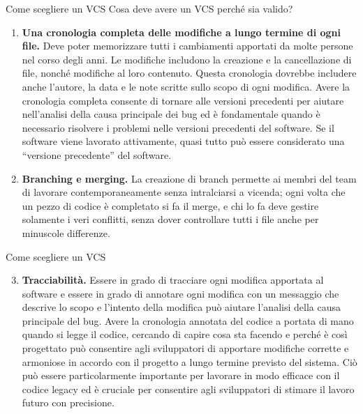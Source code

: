 \documentclass[aspectratio=169,handout,10pt]{beamer}
\begin{document}
\begin{frame}{Come scegliere un VCS}
    Cosa deve avere un VCS perché sia valido?
    \begin{enumerate}
        \item \textbf{Una cronologia completa delle modifiche a lungo termine di ogni file.} Deve poter memorizzare tutti i cambiamenti apportati da molte persone nel corso degli anni. Le modifiche includono la creazione e la cancellazione di file, nonché modifiche al loro contenuto. Questa cronologia dovrebbe includere anche l'autore, la data e le note scritte sullo scopo di ogni modifica. Avere la cronologia completa consente di tornare alle versioni precedenti per aiutare nell'analisi della causa principale dei bug ed è fondamentale quando è necessario risolvere i problemi nelle versioni precedenti del software. Se il software viene lavorato attivamente, quasi tutto può essere considerato una ``versione precedente'' del software.
        \item \textbf{Branching e merging.} La creazione di branch permette ai membri del team di lavorare contemporaneamente senza intralciarsi a vicenda; ogni volta che un pezzo di codice è completato si fa il merge, e chi lo fa deve gestire solamente i veri conflitti, senza dover controllare tutti i file anche per minuscole differenze.
    \end{enumerate}
\end{frame}
\begin{frame}{Come scegliere un VCS}
    \begin{enumerate}\setcounter{enumi}{2}
        \item \textbf{Tracciabilità.} Essere in grado di tracciare ogni modifica apportata al software e essere in grado di annotare ogni modifica con un messaggio che descrive lo scopo e l'intento della modifica può aiutare l'analisi della causa principale del bug. Avere la cronologia annotata del codice a portata di mano quando si legge il codice, cercando di capire cosa sta facendo e perché è così progettato può consentire agli sviluppatori di apportare modifiche corrette e armoniose in accordo con il progetto a lungo termine previsto del sistema. Ciò può essere particolarmente importante per lavorare in modo efficace con il codice legacy ed è cruciale per consentire agli sviluppatori di stimare il lavoro futuro con precisione.      
    \end{enumerate}
\end{frame}
\end{document}
